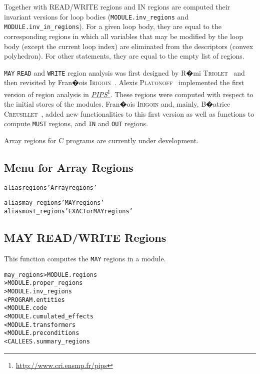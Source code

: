 \documentclass[a4paper]{report}
\newenvironment{PipsMake}{\begin{alltt}}{\end{alltt}}
\newcommand{\LINK}[2]{\href{#2}{#1}\footnote{\url{#2}}\xspace}
\newcommand{\PIPS}{\LINK{\emph{PIPS}}{http://www.cri.ensmp.fr/pips}}
\begin{document}
Together with READ/WRITE regions and IN regions are computed their
invariant versions for loop bodies (\texttt{MODULE.inv\_regions} and
\texttt{MODULE.inv\_in\_regions}). For a given loop body, they are
equal to the corresponding regions in which all variables that may be
modified by the loop body (except the current loop index) are
eliminated from the descriptors (convex polyhedron). For other
statements, they are equal to the empty list of regions.  

\verb+MAY+ \verb+READ+ and \verb+WRITE+ region analysis was first designed
by R�mi \textsc{Triolet}~\cite{T84} and then revisited by Fran�ois
\textsc{Irigoin}~\cite{TIF86}. Alexis \textsc{Platonoff}~\cite{Pla90}
implemented the first version of region analysis in \PIPS{}. These
regions were computed with respect to the initial stores of the
modules. Fran�ois \textsc{Irigoin} and, mainly, B�atrice
\textsc{Creusillet}~\cite{CI95,CI96,C96}, added new functionalities to
this first version as well as functions to compute \verb+MUST+
regions, and \verb+IN+ and \verb+OUT+ regions.  

Array regions for C programs are currently under development.



\subsection{Menu for Array Regions}

\begin{PipsMake}
alias regions 'Array regions'

alias may_regions 'MAY regions'
alias must_regions 'EXACT or MAY regions'
\end{PipsMake}

\subsection{MAY READ/WRITE Regions}
\label{subsubsection-may-regions}

This function computes the \verb|MAY| regions in a module.
\begin{PipsMake}
may_regions                     > MODULE.regions
                                > MODULE.proper_regions
                                > MODULE.inv_regions
        < PROGRAM.entities
        < MODULE.code
        < MODULE.cumulated_effects
        < MODULE.transformers
        < MODULE.preconditions     
        < CALLEES.summary_regions
\end{PipsMake}
\end{document}
